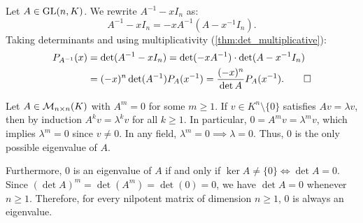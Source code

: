 \begin{exercisesolution}
\label{sol:char_poly_inverse_matrix}
Let $A \in \operatorname{GL}(n, K)$. We rewrite $A^{-1} - x I_n$ as:
\[
A^{-1} - x I_n = -x A^{-1} (A - x^{-1} I_n).
\]
Taking determinants and using multiplicativity (\cref{thm:det_multiplicative}):
\begin{align*}
P_{A^{-1}}(x) &= \det(A^{-1} - x I_n) = \det(-x A^{-1}) \cdot \det(A - x^{-1} I_n) \\
&= (-x)^n \det(A^{-1}) P_A(x^{-1}) = \frac{(-x)^n}{\det A} P_A(x^{-1}). \qedhere
\end{align*}
\end{exercisesolution}

\begin{exercisesolution}
\label{sol:nilpotent_matrix_eigenvalues}
Let $A \in \mathcal{M}_{n \times n}(K)$ with $A^m = 0$ for some $m \ge 1$.
If $v \in K^n \setminus \{0\}$ satisfies $A v = \lambda v$, then by induction $A^k v = \lambda^k v$ for all $k \ge 1$.
In particular, $0 = A^m v = \lambda^m v$, which implies $\lambda^m = 0$ since $v \ne 0$.
In any field, $\lambda^m = 0 \implies \lambda = 0$. Thus, $0$ is the only possible eigenvalue of $A$.

Furthermore, $0$ is an eigenvalue of $A$ if and only if $\ker A \ne \{0\} \iff \det A = 0$.
Since $(\det A)^m = \det(A^m) = \det(0) = 0$, we have $\det A = 0$ whenever $n \ge 1$.
Therefore, for every nilpotent matrix of dimension $n \ge 1$, $0$ is always an eigenvalue.
\end{exercisesolution}

